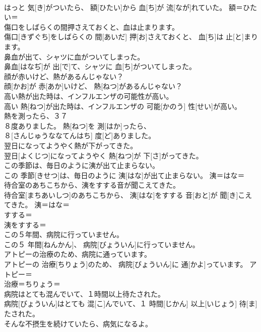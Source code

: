 \documentclass[8pt]{extreport}
\begin{document}
\begin{CJK}{UTF8}{min}
\\	はっと 気[き]がついたら、 額[ひたい]から 血[ち]が 流[なが]れていた。	額＝ひたい＝ 
\\	傷口をしばらくの間押さえておくと、血は止まります。	
\\	傷口[きずぐち]をしばらくの 間[あいだ] 押[お]さえておくと、 血[ち]は 止[と]まります。	
\\	鼻血が出て、シャツに血がついてしまった。	
\\	鼻血[はなぢ]が 出[で]て、シャツに 血[ち]がついてしまった。	
\\	顔が赤いけど、熱があるんじゃない？	
\\	顔[かお]が 赤[あか]いけど、 熱[ねつ]があるんじゃない？	
\\	高い熱が出た時は、インフルエンザの可能性が高い。	
\\	高い 熱[ねつ]が出た時は、インフルエンザの 可能[かのう] 性[せい]が高い。	
\\	熱を測ったら、３７
\\	８度ありました。		熱[ねつ]を 測[はか]ったら、 
\\	８[さんじゅうななてんはち] 度[ど]ありました。	
\\	翌日になってようやく熱が下がってきた。	
\\	翌日[よくじつ]になってようやく 熱[ねつ]が 下[さ]がってきた。	
\\	この季節は、毎日のように洟が出て止まらない。	
\\	この 季節[きせつ]は、毎日のように 洟[はな]が出て止まらない。	洟＝はな＝ 
\\	待合室のあちこちから、洟をすする音が聞こえてきた。	
\\	待合室[まちあいしつ]のあちこちから、 洟[はな]をすする 音[おと]が 聞[き]こえてきた。	洟＝はな＝ 
\\	すする＝ 
\\	洟をすする＝ 
\\	この５年間、病院に行っていません。	
\\	この５ 年間[ねんかん]、 病院[びょういん]に行っていません。	
\\	アトピーの治療のため、病院に通っています。	
\\	アトピーの 治療[ちりょう]のため、 病院[びょういん]に 通[かよ]っています。	アトピー＝ 
\\	治療＝ちりょう＝ 
\\	病院はとても混んでいて、１時間以上待たされた。	
\\	病院[びょういん]はとても 混[こ]んでいて、１ 時間[じかん] 以上[いじょう] 待[ま]たされた。	
\\	そんな不摂生を続けていたら、病気になるよ。	

\end{CJK}
\end{document}
